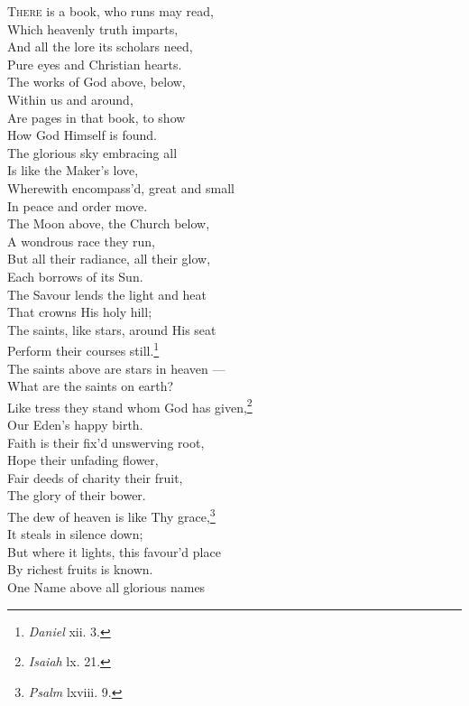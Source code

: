 \textsc{There} is a book, who runs may read, \\
 Which heavenly truth imparts, \\
 And all the lore its scholars need, \\
 Pure eyes and Christian hearts. \\
  The works of God above, below, \\
 Within us and around, \\
 Are pages in that book, to show \\
 How God Himself is found. \\
  The glorious sky embracing all \\
 Is like the Maker’s love, \\
 Wherewith encompass’d, great and small \\
 In peace and order move. \\
  The Moon above, the Church below, \\
 A wondrous race they run, \\
 But all their radiance, all their glow, \\
 Each borrows of its Sun. \\
  The Savour lends the light and heat \\
 That crowns His holy hill; \\
 The saints, like stars, around His seat \\
 Perform their courses still.\footnote{\emph{Daniel} xii. 3.} \\
  The saints above are stars in heaven — \\
 What are the saints on earth? \\
 Like tress they stand whom God has given,\footnote{\emph{Isaiah} lx. 21.} \\
 Our Eden’s happy birth. \\
  Faith is their fix’d unswerving root, \\
 Hope their unfading flower, \\
 Fair deeds of charity their fruit, \\
 The glory of their bower. \\
  The dew of heaven is like Thy grace,\footnote{\emph{Psalm} lxviii. 9.} \\
 It steals in silence down; \\
 But where it lights, this favour’d place \\
 By richest fruits is known. \\
  One Name above all glorious names \\
